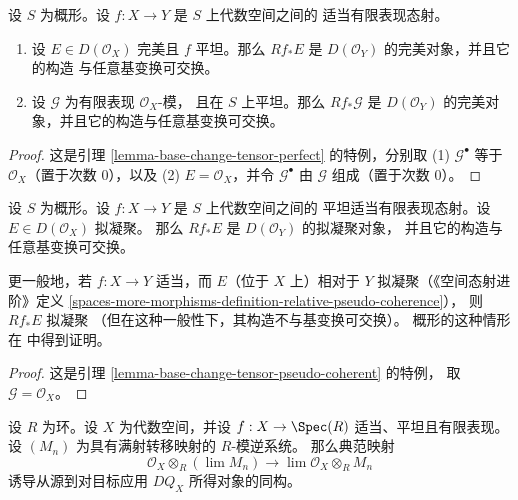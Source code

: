 \begin{lemma}
\label{lemma-flat-proper-perfect-direct-image-general}
设 $S$ 为概形。设 $f : X \to Y$ 是 $S$ 上代数空间之间的
适当有限表现态射。
\begin{enumerate}
\item 设 $E \in D(\mathcal{O}_X)$ 完美且 $f$ 平坦。那么
$Rf_*E$ 是 $D(\mathcal{O}_Y)$ 的完美对象，并且它的构造
与任意基变换可交换。
\item 设 $\mathcal{G}$ 为有限表现 $\mathcal{O}_X$-模，
且在 $S$ 上平坦。那么 $Rf_*\mathcal{G}$ 是 %
$D(\mathcal{O}_Y)$ 的完美对象，并且它的构造与任意基变换可交换。
\end{enumerate}
\end{lemma}

\begin{proof}
这是引理 \ref{lemma-base-change-tensor-perfect} 的特例，分别取
(1) $\mathcal{G}^\bullet$ 等于 $\mathcal{O}_X$（置于次数 $0$），以及
(2) $E = \mathcal{O}_X$，并令 $\mathcal{G}^\bullet$
由 $\mathcal{G}$ 组成（置于次数 $0$）。
\end{proof}

\begin{lemma}
\label{lemma-flat-proper-pseudo-coherent-direct-image-general}
设 $S$ 为概形。设 $f : X \to Y$ 是 $S$ 上代数空间之间的
平坦适当有限表现态射。设 $E \in D(\mathcal{O}_X)$ 拟凝聚。
那么 $Rf_*E$ 是 $D(\mathcal{O}_Y)$ 的拟凝聚对象，
并且它的构造与任意基变换可交换。
\end{lemma}

\noindent
更一般地，若 $f : X \to Y$ 适当，而 $E$（位于 $X$ 上）相对于
$Y$ 拟凝聚（《空间态射进阶》定义
\ref{spaces-more-morphisms-definition-relative-pseudo-coherence}），
则 $Rf_*E$ 拟凝聚
（但在这种一般性下，其构造不与基变换可交换）。
概形的这种情形在 \cite{Kiehl} 中得到证明。

\begin{proof}
这是引理 \ref{lemma-base-change-tensor-pseudo-coherent} 的特例，
取 $\mathcal{G} = \mathcal{O}_X$。
\end{proof}

\begin{lemma}
\label{lemma-pullback-and-limits}
设 $R$ 为环。设 $X$ 为代数空间，并设
$f : X \to \Spec(R)$ 适当、平坦且有限表现。
设 $(M_n)$ 为具有满射转移映射的 $R$-模逆系统。
那么典范映射
$$
\mathcal{O}_X \otimes_R (\lim M_n)
\longrightarrow
\lim \mathcal{O}_X \otimes_R M_n
$$
诱导从源到对目标应用 $DQ_X$ 所得对象的同构。
\end{lemma}

